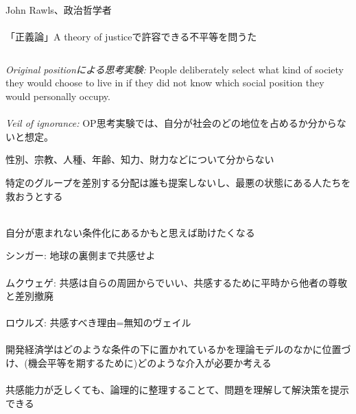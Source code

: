 \begin{frame}[t, label=Rawls]{}
\begin{columns}[T]
\column{.5\paperwidth}
John Rawls、政治哲学者 {\scriptsize\url{}} \\~\\
\pause
「正義論」A theory of justiceで許容できる不平等を問うた
\column{.45\paperwidth}
\hfil{} \\
\end{columns}

\vspace{2ex}
\pause
\textit{Original positionによる思考実験:} People deliberately select what kind of society they would choose to live in if they did not know which social position they would personally occupy. \\~\\
\pause
\textit{Veil of ignorance:} OP思考実験では、自分が社会のどの地位を占めるか分からないと想定。
\begin{dinglist}{43}
\vspace{1.0ex}\setlength{\itemsep}{1.0ex}\setlength{\baselineskip}{12pt}
\pause
\item	性別、宗教、人種、年齢、知力、財力などについて分からない
\end{dinglist}
\vspace{2ex}
\pause
特定のグループを差別する分配は誰も提案しないし、最悪の状態にある人たちを救おうとする\\~\\
\pause
\begin{dinglist}{43}
\vspace{1.0ex}\setlength{\itemsep}{1.0ex}\setlength{\baselineskip}{12pt}
\item	自分が恵まれない条件化にあるかもと思えば助けたくなる
\end{dinglist}
\end{frame}

\begin{frame}[t, label=SingerMukwegeRawls]{}
シンガー: 地球の裏側まで共感せよ\\~\\
ムクウェゲ: 共感は自らの周囲からでいい、共感するために平時から他者の尊敬と差別撤廃\\~\\
ロウルズ: 共感すべき理由=無知のヴェイル\\~\\
\pause
開発経済学はどのような条件の下に置かれているかを理論モデルのなかに位置づけ、(機会平等を期するために)どのような介入が必要か考える\\~\\
\pause
共感能力が乏しくても、論理的に整理することて、問題を理解して解決策を提示できる
\end{frame}

